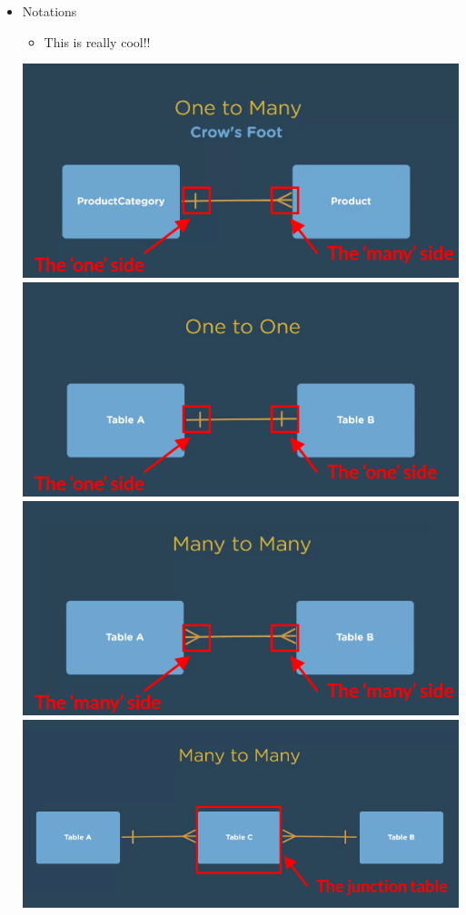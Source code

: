 \documentclass[12pt]{article}
\begin{document}
\begin{itemize}
    \item Notations
    \begin{itemize}
        \item This is really cool!!
    \end{itemize}

    \begin{center}
    \includegraphics[width=0.8\linewidth]{images/part_3_notes_4.png}
    \includegraphics[width=0.8\linewidth]{images/part_3_notes_5.png}
    \includegraphics[width=0.8\linewidth]{images/part_3_notes_6.png}
    \includegraphics[width=0.8\linewidth]{images/part_3_notes_7.png}
    \end{center}
\end{itemize}
\end{document}
